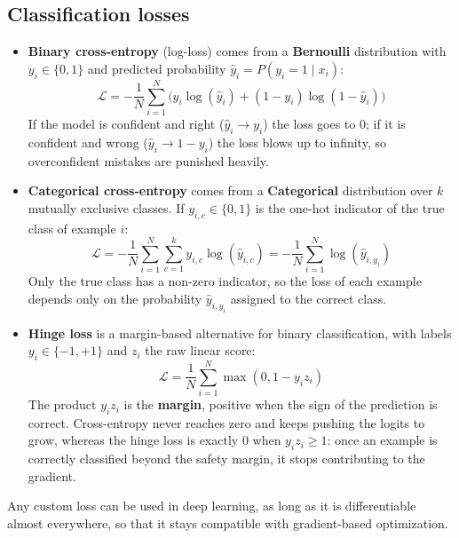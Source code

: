 \subsection{Classification losses}
\begin{itemize}
    \item \textbf{Binary cross-entropy} (log-loss) comes from a \textbf{Bernoulli}
          distribution with $y_i \in \{0, 1\}$ and predicted probability
          $\hat{y}_i = P(y_i = 1 \mid x_i)$:
          \begin{equation}
              \mathcal{L} = - \frac{1}{N} \sum_{i=1}^N \Big( y_i \log(\hat{y}_i) + (1-y_i) \log(1-\hat{y}_i) \Big)
          \end{equation}
          If the model is confident and right ($\hat{y}_i \to y_i$) the loss goes to
          $0$; if it is confident and wrong ($\hat{y}_i \to 1 - y_i$) the loss
          blows up to infinity, so overconfident mistakes are punished heavily.
    \item \textbf{Categorical cross-entropy} comes from a \textbf{Categorical}
          distribution over $k$ mutually exclusive classes. If $y_{i,c} \in \{0,1\}$
          is the one-hot indicator of the true class of example $i$:
          \begin{equation}
              \mathcal{L} = - \frac{1}{N} \sum_{i=1}^N \sum_{c=1}^k y_{i,c} \log(\hat{y}_{i,c}) = - \frac{1}{N} \sum_{i=1}^N \log(\hat{y}_{i, y_i})
          \end{equation}
          Only the true class has a non-zero indicator, so the loss of each example
          depends only on the probability $\hat{y}_{i, y_i}$ assigned to the correct
          class.
    \item \textbf{Hinge loss} is a margin-based alternative for binary
          classification, with labels $y_i \in \{-1, +1\}$ and $z_i$ the raw linear
          score:
          \begin{equation}
              \mathcal{L} = \frac{1}{N} \sum_{i=1}^N \max(0, 1 - y_i z_i)
          \end{equation}
          The product $y_i z_i$ is the \textbf{margin}, positive when the sign of
          the prediction is correct. Cross-entropy never reaches zero and keeps
          pushing the logits to grow, whereas the hinge loss is exactly $0$ when
          $y_i z_i \geq 1$: once an example is correctly classified beyond the
          safety margin, it stops contributing to the gradient.
\end{itemize}
\begin{note}
    Any custom loss can be used in deep learning, as long as it is differentiable
    almost everywhere, so that it stays compatible with gradient-based
    optimization.
\end{note}


